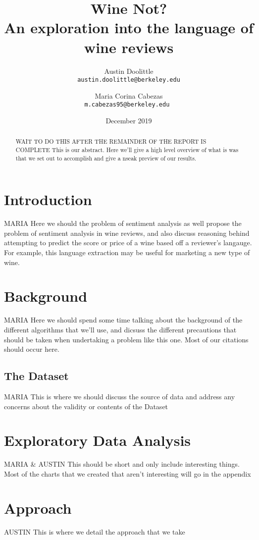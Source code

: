 \documentclass[11pt,english]{article}
\title{
    Wine Not? \\
    \large An exploration into the language of wine reviews
}
\author{
    Austin Doolittle \\
    \texttt{austin.doolittle@berkeley.edu}
    \and
    Maria Corina Cabezas \\
    \texttt{m.cabezas95@berkeley.edu }
}
\date{December 2019}
\begin{document}
\maketitle
\begin{abstract}
    WAIT TO DO THIS AFTER THE REMAINDER OF THE REPORT IS COMPLETE
    This is our abstract. Here we'll give a high level overview of what is was that we set out to accomplish and give a nseak preview of our results.
\end{abstract}

\section{Introduction}
    MARIA
    Here we should the problem of sentiment analysis as well propose the problem of sentiment analysis in wine reviews, and also discuss reasoning behind attempting to predict the score or price of a wine based off a reviewer's langauge. For example, this language extraction may be useful for marketing a new type of wine.

\section{Background}
    MARIA
    Here we should spend some time talking about the background of the different algorithms that we'll use, and dicsuss the different precautions that should be taken when undertaking a problem like this one. Most of our citations should occur here.

\subsection{The Dataset}
    MARIA
    This is where we should discuss the source of data and address any concerns about the validity or contents of the Dataset

\section{Exploratory Data Analysis}
    MARIA & AUSTIN
    This should be short and only include interesting things. Most of the charts that we created that aren't interesting will go in the appendix

\section{Approach}
    AUSTIN
    This is where we detail the approach that we take
\end{document}
